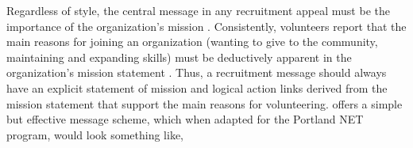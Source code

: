 \documentclass[11pt,fleqn]{book} %
\begin{document}
\noindent Regardless of style, the central message in any recruitment appeal must be the importance of the organization's mission \autocite{wymer_jr._conceptual_2001}. Consistently, volunteers report that the main reasons for joining an organization (wanting to give to the
community, maintaining and expanding skills) must be deductively apparent in the organization's mission statement \autocite{ranse_engaging_2010}. Thus, a recruitment message should always have an explicit statement of mission and logical action links derived from the mission statement that support the main reasons for volunteering. \textcite{shields_young_2009} offers a simple but effective message scheme, which when adapted for the Portland NET program, would look something like,\\
\end{document}
